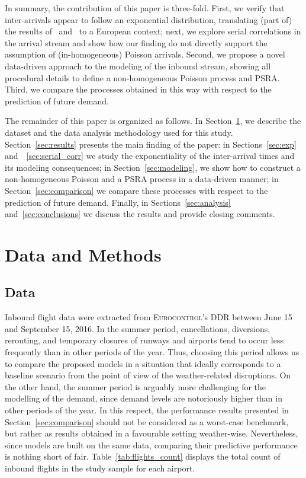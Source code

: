 \documentclass[draft,review]{elsarticle}
\begin{document}
In summary, the contribution of this paper is three-fold.
First, we verify that inter-arrivals appear to follow an exponential distribution, translating (part of) the results of~\cite{willemain2004statistical} and~\citep{gwiggner2014data} to a European context; next, we explore serial correlations in the arrival stream and show how our finding do not directly support the assumption of (in-homogeneous) Poisson arrivals. Second, we propose a novel data-driven approach to the modeling of the inbound stream, showing all procedural details to define a non-homogeneous Poisson process and \ac{PSRA}. Third, we compare the processes obtained in this way with respect to the prediction of future demand.

The remainder of this paper is organized as follows.
In Section~\ref{sec:data_methods}, we describe the dataset and the data analysis methodology used for this study.
Section~\ref{sec:results} presents the main finding of the paper:
in Sections~\ref{sec:exp} and~~\ref{sec:serial_corr} we study the exponentiality of the inter-arrival times and its modeling consequences; in Section~\ref{sec:modeling}, we show how to construct a non-homogeneous Poisson and a \ac{PSRA} process in a data-driven manner;  in Section~\ref{sec:comparison} we compare these processes  with respect to the prediction of future demand.
Finally, in Sections~\ref{sec:analysis} and~\ref{sec:conclusions} we discuss the results and provide closing comments.

\section{Data and Methods}\label{sec:data_methods}

\subsection{Data}\label{sec:dm_data}

Inbound flight data were extracted from \textsc{Eurocontrol}'s \ac{DDR} between June 15 and September 15, 2016.
In the summer period, cancellations, diversions, rerouting, and temporary closures of runways and airports tend to occur less frequently than in other periods of the year. Thus, choosing this period allows us to compare the proposed models in a situation that ideally corresponds to a baseline scenario from the point of view of the weather-related disruptions.
On the other hand, the summer period is arguably more challenging for the modelling of the demand, since demand levels are notoriously higher than in other periods of the year.
In this respect, the performance results presented in Section~\ref{sec:comparison} should not be considered as a worst-case benchmark, but rather as results obtained in a favourable setting weather-wise. Nevertheless, since models are built on the same data, comparing their predictive performance is nothing short of fair.
Table~\ref{tab:flights_count} displays the total count of inbound flights in the study sample for each airport.
\end{document}
